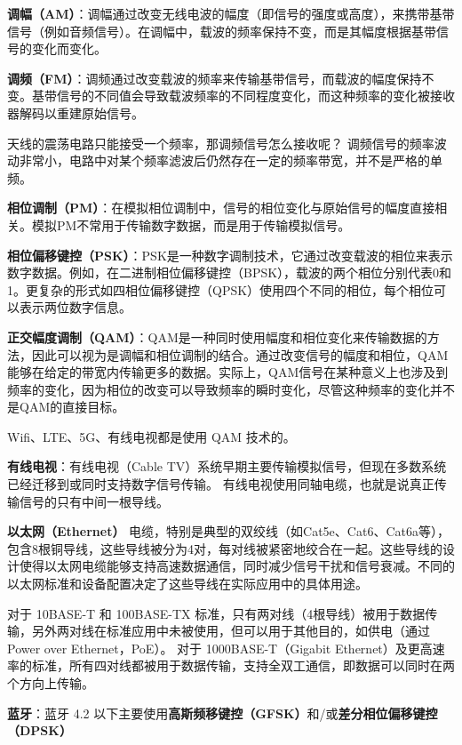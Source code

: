 

\begin{issues}
\issueDraft
\end{issues}

\textbf{调幅（AM）}：调幅通过改变无线电波的幅度（即信号的强度或高度），来携带基带信号（例如音频信号）。在调幅中，载波的频率保持不变，而是其幅度根据基带信号的变化而变化。

\textbf{调频（FM）}：调频通过改变载波的频率来传输基带信号，而载波的幅度保持不变。基带信号的不同值会导致载波频率的不同程度变化，而这种频率的变化被接收器解码以重建原始信号。

天线的震荡电路只能接受一个频率，那调频信号怎么接收呢？ 调频信号的频率波动非常小，电路中对某个频率滤波后仍然存在一定的频率带宽，并不是严格的单频。

\textbf{相位调制（PM）}：在模拟相位调制中，信号的相位变化与原始信号的幅度直接相关。模拟PM不常用于传输数字数据，而是用于传输模拟信号。

\textbf{相位偏移键控（PSK）}：PSK是一种数字调制技术，它通过改变载波的相位来表示数字数据。例如，在二进制相位偏移键控（BPSK），载波的两个相位分别代表0和1。更复杂的形式如四相位偏移键控（QPSK）使用四个不同的相位，每个相位可以表示两位数字信息。

\textbf{正交幅度调制（QAM）}：QAM是一种同时使用幅度和相位变化来传输数据的方法，因此可以视为是调幅和相位调制的结合。通过改变信号的幅度和相位，QAM能够在给定的带宽内传输更多的数据。实际上，QAM信号在某种意义上也涉及到频率的变化，因为相位的改变可以导致频率的瞬时变化，尽管这种频率的变化并不是QAM的直接目标。

Wifi、LTE、5G、有线电视都是使用 QAM 技术的。

\textbf{有线电视}：有线电视（Cable TV）系统早期主要传输模拟信号，但现在多数系统已经迁移到或同时支持数字信号传输。 有线电视使用同轴电缆，也就是说真正传输信号的只有中间一根导线。

\textbf{以太网（Ethernet）} 电缆，特别是典型的双绞线（如Cat5e、Cat6、Cat6a等），包含8根铜导线，这些导线被分为4对，每对线被紧密地绞合在一起。这些导线的设计使得以太网电缆能够支持高速数据通信，同时减少信号干扰和信号衰减。不同的以太网标准和设备配置决定了这些导线在实际应用中的具体用途。

对于 10BASE-T 和 100BASE-TX 标准，只有两对线（4根导线）被用于数据传输，另外两对线在标准应用中未被使用，但可以用于其他目的，如供电（通过 Power over Ethernet，PoE）。
对于 1000BASE-T（Gigabit Ethernet）及更高速率的标准，所有四对线都被用于数据传输，支持全双工通信，即数据可以同时在两个方向上传输。

\textbf{蓝牙}：蓝牙 4.2 以下主要使用\textbf{高斯频移键控（GFSK）}和/或\textbf{差分相位偏移键控（DPSK）}

